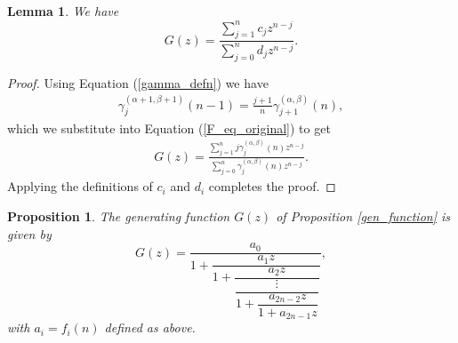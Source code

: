 \documentclass[10pt,a4paper]{amsart}
\newtheorem{lem}[equation]{Lemma}
\newtheorem{prop}[equation]{Proposition}
\begin{document}
\begin{lem} \label{F_eq_cd}
We have \[G(z)=\frac{\sum_{j=1}^{n}c_jz^{n-j}}{\sum_{j=0}^nd_jz^{n-j}}.\]
\end{lem}

\begin{proof}
Using Equation (\ref{gamma_defn}) we have
\begin{align*}
    \gamma_j^{(\alpha+1,\beta+1)}(n-1)=\frac{j+1}{n}\gamma_{j+1}^{(\alpha,\beta)}(n),
\end{align*}
which we substitute into Equation (\ref{F_eq_original}) to get
\begin{align*}
    G(z)=\frac{\sum_{j=1}^{n}j\gamma_j^{(\alpha,\beta)}(n)z^{n-j}}{\sum_{j=0}^n\gamma_j^{(\alpha,\beta)}(n)z^{n-j}}.
\end{align*}
Applying the definitions of $c_i$ and $d_i$ completes the proof.
\end{proof}

\begin{prop} \label{cont_frac_prop}
The generating function $G(z)$ of Proposition \ref{gen_function} is given by  \[G(z)=\dfrac{a_0}{1+\dfrac{a_1z}{1+\dfrac{a_2z}{\dfrac{\vdots}{1+\dfrac{a_{2n-2}z}{1+a_{2n-1}z}}}}},\]
with $a_i=f_i(n)$ defined as above.
\end{prop}
\end{document}
